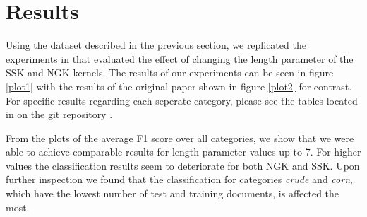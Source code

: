 \section{Results} \label{sec:results}
Using the dataset described in the previous section, we replicated the experiments in \cite{ssk} that evaluated the effect of changing the length parameter of the SSK and NGK kernels. The results of our experiments can be seen in figure \ref{plot1} with the results of the original paper shown in figure \ref{plot2} for contrast. For specific results regarding each seperate category, please see the tables located in  on the git repository \cite{git}.

From the plots of the average F1 score over all categories, we show that we were able to achieve comparable results for length parameter values up to 7. For higher values the classification results seem to deteriorate for both NGK and SSK. Upon further inspection we found that the classification for categories \textit{crude} and \textit{corn}, which have the lowest number of test and training documents, is affected the most. 
